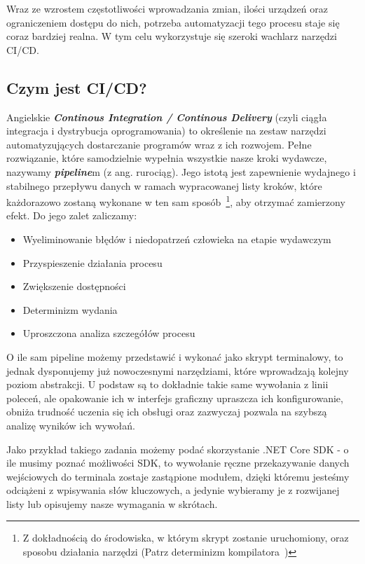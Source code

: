 Wraz ze wzrostem częstotliwości wprowadzania zmian, ilości urządzeń oraz ograniczeniem dostępu do nich,
potrzeba automatyzacji tego procesu staje się coraz bardziej realna. 
W tym celu wykorzystuje się szeroki wachlarz narzędzi CI/CD. \todo{}

\subsection{Czym jest CI/CD?}
Angielskie \textbf{\textit{Continous Integration / Continous Delivery}} (czyli ciągła integracja i dystrybucja oprogramowania) 
to określenie na zestaw narzędzi automatyzujących dostarczanie programów wraz z ich rozwojem. 
Pełne rozwiązanie, które samodzielnie wypełnia wszystkie nasze kroki wydawcze, nazywamy \textbf{\textit{pipeline}}m (z ang. rurociąg).
Jego istotą jest zapewnienie wydajnego i stabilnego przepływu danych w ramach wypracowanej listy kroków, 
które każdorazowo zostaną wykonane w ten sam sposób~\footnote[1]{
    \label{determinismFootnote}
    Z dokładnością do środowiska, w którym skrypt zostanie uruchomiony, 
    oraz sposobu działania narzędzi (Patrz determinizm kompilatora~\cite{compilerDeterminism})
}, aby otrzymać zamierzony efekt.
Do jego zalet zaliczamy:
\begin{itemize}
    \item Wyeliminowanie błędów i niedopatrzeń człowieka na etapie wydawczym
    \item Przyspieszenie działania procesu
    \item Zwiększenie dostępności 
    \item Determinizm wydania~
    \item Uproszczona analiza szczegółów procesu
\end{itemize}

O ile sam pipeline możemy przedstawić i wykonać jako skrypt terminalowy, 
to jednak dysponujemy już nowoczesnymi narzędziami, które wprowadzają kolejny poziom abstrakcji.
U podstaw są to dokładnie takie same wywołania z linii poleceń, ale opakowanie ich w interfejs graficzny 
upraszcza ich konfigurowanie, obniża trudność uczenia się ich obsługi oraz zazwyczaj pozwala na szybszą analizę 
wyników ich wywołań.

Jako przykład takiego zadania możemy podać skorzystanie .NET Core SDK - o ile musimy poznać możliwości SDK,
to wywołanie ręczne przekazywanie danych wejściowych do terminala zostaje zastąpione modułem, 
dzięki któremu jesteśmy odciążeni z wpisywania słów kluczowych, a jedynie wybieramy je z rozwijanej listy 
lub opisujemy nasze wymagania w skrótach. 

